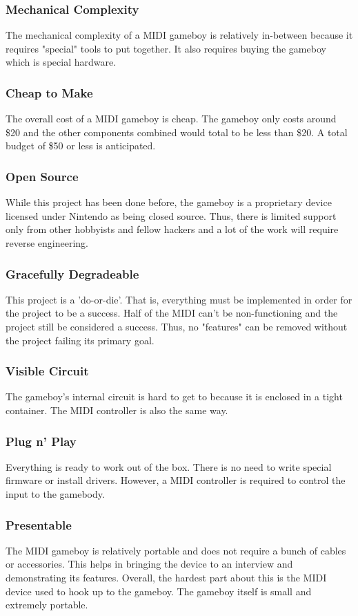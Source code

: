 \documentclass{article}
\begin{document}
\subsubsection {Mechanical Complexity}
The mechanical complexity of a MIDI gameboy is relatively in-between
because it requires "special" tools to put together. It also requires
buying the gameboy which is special hardware.
\subsubsection{Cheap to Make}
The overall cost of a MIDI gameboy is cheap. The gameboy only costs
around \$20 and the other components combined would total to be less
than \$20. A total budget of \$50 or less is anticipated.
\subsubsection{Open Source}
While this project has been done before, the gameboy is a proprietary
device licensed under Nintendo as being closed source. Thus, there is
limited support only from other hobbyists and fellow hackers and a lot
of the work will require reverse engineering.
\subsubsection{Gracefully Degradeable}
This project is a 'do-or-die'. That is, everything must be implemented
in order for the project to be a success. Half of the MIDI can't be
non-functioning and the project still be considered a success. Thus,
no "features" can be removed without the project failing its primary
goal.
\subsubsection{Visible Circuit}
The gameboy's internal circuit is hard to get to because it is
enclosed in a tight container. The MIDI controller is also the same
way.
\subsubsection{Plug n' Play}
Everything is ready to work out of the box. There is no need to write
special firmware or install drivers. However, a MIDI controller is
required to control the input to the gamebody.
\subsubsection{Presentable}
The MIDI gameboy is relatively portable and does not require a bunch
of cables or accessories. This helps in bringing the device to an
interview and demonstrating its features. Overall, the hardest part
about this is the MIDI device used to hook up to the gameboy. The
gameboy itself is small and extremely portable.
\end{document}
